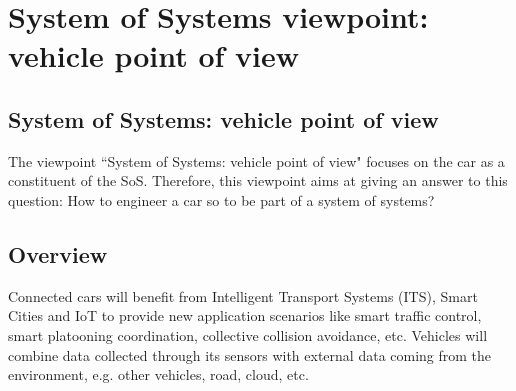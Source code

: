 \section{System of Systems viewpoint: vehicle point of view}\label{sec:SoSVP}
\renewcommand{\Fillin}[1]{{System of Systems: vehicle point of view}}
\subsection{\Fillin{Viewpoint Name}}\label{vp:template}

The viewpoint ``\Fillin{Viewpoint Name}" focuses on the car as a constituent of the SoS. Therefore, this viewpoint aims at giving an
answer to this question: How to engineer a car so to be part of a system
of systems?



\subsection{Overview} 
Connected cars will benefit from Intelligent Transport Systems (ITS), Smart Cities and IoT to provide new application scenarios like smart traffic control,  smart platooning coordination, collective collision avoidance, etc. 
Vehicles will combine data collected through its sensors %
with external data coming from the environment, e.g. other vehicles, road, cloud, etc. %

